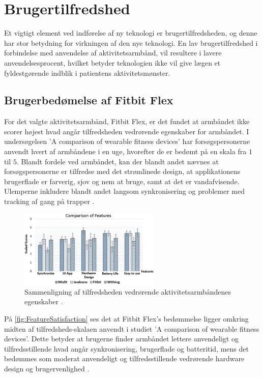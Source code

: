\section{Brugertilfredshed}

Et vigtigt element ved indførelse af ny teknologi er brugertilfredsheden, og denne har stor betydning for virkningen af den nye teknologi. En lav brugertilfredshed i forbindelse med anvendelse af aktivitetsarmbånd, vil resultere i lavere anvendelsesprocent, hvilket betyder teknologien ikke vil give lægen et fyldestgørende indblik i patientens aktivitetsmønster.

\subsection{Brugerbedømelse af Fitbit Flex}

For det valgte aktivitetsarmbånd, Fitbit Flex, er det fundet at armbåndet ikke scorer højest hvad angår tilfredsheden vedrørende egenskaber for armbåndet. I undersøgelsen 'A comparison of wearable fitness devices' har forsøgspersonerne anvendt hvert af armbåndene i en uge, hvorefter de er bedømt på en skala fra $1$ til $5$. Blandt fordele ved armbåndet, kan der blandt andet nævnes at forsøgspersonerne er tilfredse med det strømlinede design, at applikationens brugerflade er farverig, sjov og nem at bruge, samt at det er vandafvisende. Ulemperne inkludere blandt andet langsom synkronisering og problemer med tracking af gang på trapper \citep{kaewkannate2016}.

\begin{figure}[H]
	\centering
	\includegraphics[width=0.6\textwidth]{figures/FeatureSatisfaction}
	\caption{Sammenligning af tilfredsheden vedrørende aktivitetsarmbåndenes egenskaber \citep{kaewkannate2016}.}
	\label{fig:FeatureSatisfaction}
\end{figure}

På \autoref{fig:FeatureSatisfaction} ses det at Fitbit Flex's bedømmelse ligger omkring midten af tilfredsheds-skalaen anvendt i studiet 'A comparison of wearable fitness devices'. Dette betyder at brugerne finder armbåndet lettere anvendeligt og tilfredsstillende hvad angår synkronisering, brugerflade og batteritid, mens det bedømmes som moderat anvendeligt og tilfredsstillende vedrørende hardware design og brugervenlighed \citep{kaewkannate2016}.

